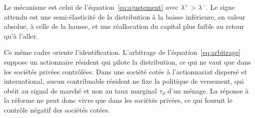 \noindent Le mécanisme est celui de l'équation~\eqref{eq:ajustement} avec $\lambda^{+} > \lambda^{-}$.
Le signe attendu est une semi-élasticité de la distribution à la baisse inférieure, en valeur
absolue, à celle de la hausse, et une réallocation du capital plus faible au retour qu'à l'aller.

Ce même cadre oriente l'identification. L'arbitrage de l'équation~\eqref{eq:arbitrage} suppose un
actionnaire résident qui pilote la distribution, ce qui ne vaut que dans les sociétés privées
contrôlées. Dans une société cotée à l'actionnariat dispersé et international, aucun contribuable
résident ne fixe la politique de versement, qui obéit au signal de marché et non au taux marginal
$\tau_d$ d'un ménage. La réponse à la réforme ne peut donc vivre que dans les sociétés privées, ce
qui fournit le contrôle négatif des sociétés cotées.
